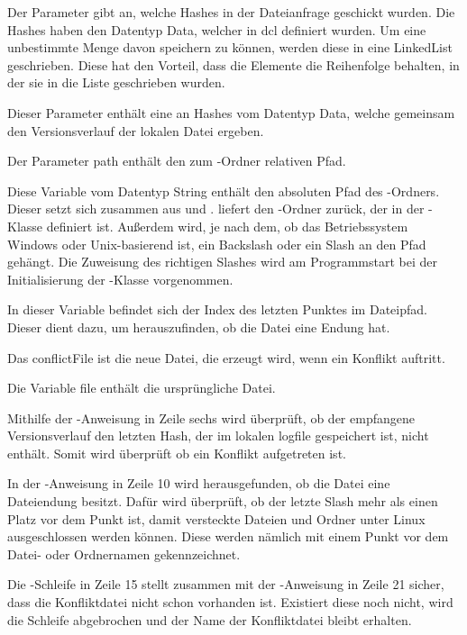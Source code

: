\begin{description}
	 Der Parameter gibt an, welche Hashes in der Dateianfrage geschickt wurden. Die Hashes haben den Datentyp Data, welcher in \gls{dcl} definiert wurden. Um eine unbestimmte Menge davon speichern zu können, werden diese in eine LinkedList geschrieben. Diese hat den Vorteil, dass die Elemente die Reihenfolge behalten, in der sie in die Liste geschrieben wurden.
	
	 Dieser Parameter enthält eine  an Hashes vom Datentyp Data, welche gemeinsam den Versionsverlauf der lokalen Datei ergeben. 
	
	 Der Parameter path enthält den zum \sblit-Ordner relativen Pfad.
	
	 Diese Variable vom Datentyp String enthält den absoluten Pfad des \sblit-Ordners. Dieser setzt sich zusammen aus  und .  liefert den \sblit-Ordner zurück, der in der -Klasse definiert ist. Außerdem wird, je nach dem, ob das Betriebssystem Windows oder Unix-basierend ist, ein Backslash oder ein Slash an den Pfad gehängt. Die Zuweisung des richtigen Slashes wird am Programmstart bei der Initialisierung der -Klasse vorgenommen.

	 In dieser Variable befindet sich der Index des letzten Punktes im Dateipfad. Dieser dient dazu, um herauszufinden, ob die Datei eine Endung hat.
	
	 Das conflictFile ist die neue Datei, die erzeugt wird, wenn ein Konflikt auftritt.
	
	 Die Variable file enthält die ursprüngliche Datei.
\end{description}
Mithilfe der -Anweisung in Zeile sechs wird überprüft, ob der empfangene Versionsverlauf den letzten Hash, der im lokalen \gls{logfile} gespeichert ist, nicht enthält. Somit wird überprüft ob ein Konflikt aufgetreten ist. 

In der -Anweisung in Zeile 10 wird herausgefunden, ob die Datei eine Dateiendung besitzt. Dafür wird überprüft, ob der letzte Slash mehr als einen Platz vor dem Punkt ist, damit versteckte Dateien und Ordner unter Linux ausgeschlossen werden können. Diese werden nämlich mit einem Punkt vor dem Datei- oder Ordnernamen gekennzeichnet.

Die -Schleife in Zeile 15 stellt zusammen mit der -Anweisung in Zeile 21 sicher, dass die Konfliktdatei nicht schon vorhanden ist. Existiert diese noch nicht, wird die Schleife abgebrochen und der Name der Konfliktdatei bleibt erhalten.